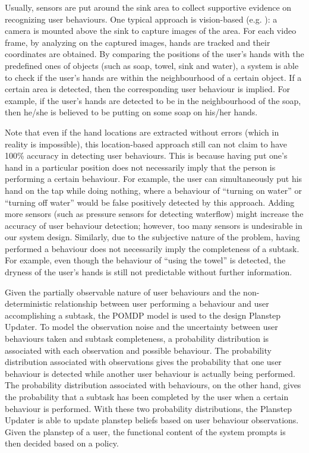 Usually, sensors are put around the sink area to collect supportive evidence on recognizing user behaviours. One typical approach is vision-based (e.g. \cite{hoey2006tracking, mihailidis2004use, czarnuch2014}): a camera is mounted above the sink to capture images of the area. For each video frame, by analyzing on the captured images, hands are tracked and their coordinates are obtained. By comparing the positions of the user's hands with the predefined ones of objects (such as soap, towel, sink and water), a system is able to check if the user's hands are within the neighbourhood of a certain object. If a certain area is detected, then the corresponding user behaviour is implied. For example, if the user's hands are detected to be in the neighbourhood of the soap, then he/she is believed to be putting on some soap on his/her hands. 

Note that even if the hand locations are extracted without errors (which in reality is impossible), this location-based approach still can not claim to have 100\% accuracy in detecting user behaviours. This is because having put one's hand in a particular position does not necessarily imply that the person is performing a certain behaviour. For example, the user can simultaneously put his hand on the tap while doing nothing, where a behaviour of ``turning on water'' or ``turning off water'' would be false positively detected by this approach. Adding more sensors (such as pressure sensors for detecting waterflow) might increase the accuracy of user behaviour detection; however, too many sensors is undesirable in our system design. Similarly, due to the subjective nature of the problem, having performed a behaviour does not necessarily imply the completeness of a subtask. For example, even though the behaviour of ``using the towel'' is detected, the dryness of the user's hands is still not predictable without further information. 

Given the partially observable nature of user behaviours and the non-deterministic relationship between user performing a behaviour and user accomplishing a subtask, the POMDP model is used to the design Planstep Updater. To model the observation noise and the uncertainty between user behaviours taken and subtask completeness, a probability distribution is associated with each observation and possible behaviour. The probability distribution associated with observations gives the probability that one user behaviour is detected while another user behaviour is actually being performed. The probability distribution associated with behaviours, on the other hand, gives the probability that a subtask has been completed by the user when a certain behaviour is performed. With these two probability distributions, the Planstep Updater is able to update planstep beliefs based on user behaviour observations. Given the planstep of a user, the functional content of the system prompts is then decided based on a policy.

